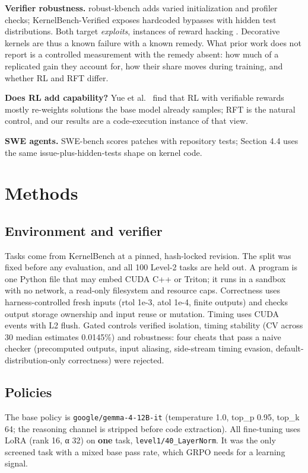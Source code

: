 \documentclass[11pt]{article}
\begin{document}
\textbf{Verifier robustness.} robust-kbench \cite{r4} adds varied initialization and
profiler checks; KernelBench-Verified \cite{r5} exposes hardcoded bypasses with hidden
test distributions. Both target \emph{exploits}, instances of reward hacking \cite{r6}.
Decorative kernels are thus a known failure with a known remedy. What prior work does not report is a
controlled measurement with the remedy absent: how much of a replicated gain they
account for, how their share moves during training, and whether RL and RFT differ.

\textbf{Does RL add capability?} Yue et al.~\cite{r7} find that RL with verifiable rewards
mostly re-weights solutions the base model already samples; RFT \cite{r8,r9} is the natural
control, and our results are a code-execution instance of that view.

\textbf{SWE agents.} SWE-bench \cite{r10} scores patches with repository tests; Section 4.4
uses the same issue-plus-hidden-tests shape on kernel code.

\section{Methods}\label{methods}

\subsection{Environment and verifier}\label{environment-and-verifier}

Tasks come from KernelBench at a pinned, hash-locked revision. The split was fixed
before any evaluation, and all 100 Level-2 tasks are held out. A program is one
Python file that may embed CUDA C++ or Triton; it runs in a sandbox with no network,
a read-only filesystem and resource caps. Correctness uses harness-controlled fresh
inputs (rtol 1e-3, atol 1e-4, finite outputs) and checks output storage ownership and
input reuse or mutation. Timing uses CUDA events with L2 flush. Gated controls
verified isolation, timing stability (CV across 30 median estimates 0.0145\%) and
robustness: four cheats that pass a naive checker (precomputed outputs, input
aliasing, side-stream timing evasion, default-distribution-only correctness) were
rejected.

\subsection{Policies}\label{policies}

The base policy is \texttt{google/\allowbreak{}gemma-4-12B-it} (temperature 1.0, top\_p 0.95, top\_k 64;
the reasoning channel is stripped before code extraction). All fine-tuning uses LoRA
(rank 16, α 32) on \textbf{one} task, \texttt{level1/\allowbreak{}40\_\allowbreak{}LayerNorm}. It was the only screened task with a mixed base pass rate,
which GRPO needs for a learning signal.
\end{document}
